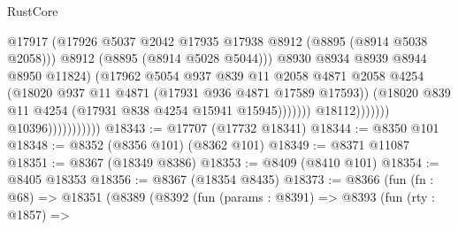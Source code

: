 \begin{lexlean}{RustCore}
\begin{coremodule}
                                                    @17917
                                                    (@17926
                                                      @5037
                                                      @2042
                                                      @17935
                                                      @17938
                                                      @8912
                                                      (@8895 (@8914 @5038 @2058)))
                                                    @8912
                                                    (@8895 (@8914 @5028 @5044)))
                                                  @8930
                                                  @8934
                                                  @8939
                                                  @8944
                                                  @8950
                                                  @11824)
                                                (@17962
                                                  @5054
                                                  @937
                                                  @839
                                                  @11
                                                  @2058
                                                  @4871
                                                  @2058
                                                  @4254
                                                  (@18020
                                                    @937
                                                    @11
                                                    @4871
                                                    (@17931 @936 @4871 @17589 @17593))
                                                  (@18020
                                                    @839
                                                    @11
                                                    @4254
                                                    (@17931 @838 @4254 @15941 @15945)))))))
                                        @18112)))))))
                          @10396)))))))))))
@18343 := @17707 (@17732 @18341)
@18344 := @8350 @101
@18348 := @8352 (@8356 @101) (@8362 @101)
@18349 := @8371 @11087
@18351 := @8367 (@18349 @8386)
@18353 := @8409 (@8410 @101)
@18354 := @8405 @18353
@18356 := @8367 (@18354 @8435)
@18373 := @8366
    (fun (fn : @68) =>
    @18351
      (@8389
        (@8392
          (fun (params : @8391) =>
          @8393
            (fun (rty : @1857) =>

\end{coremodule}
\end{lexlean}
